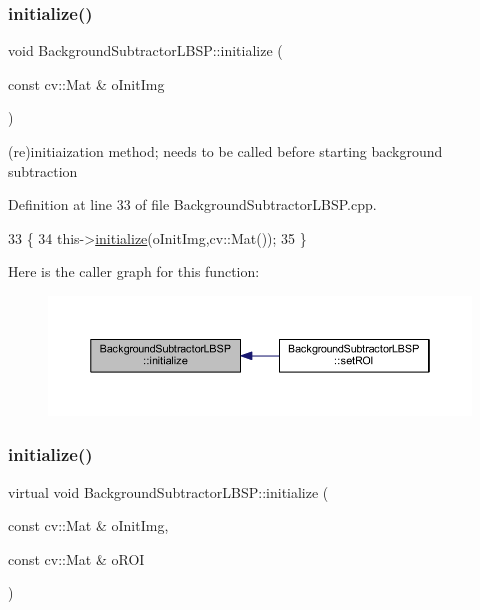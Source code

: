 \subsubsection{\texorpdfstring{initialize()}{initialize()}\hspace{0.1cm}{\footnotesize\ttfamily [1/2]}}
{\footnotesize\ttfamily void Background\+Subtractor\+L\+B\+S\+P\+::initialize (\begin{DoxyParamCaption}\item[{const cv\+::\+Mat \&}]{o\+Init\+Img }\end{DoxyParamCaption})\hspace{0.3cm}{\ttfamily [virtual]}}



(re)initiaization method; needs to be called before starting background subtraction 



Definition at line 33 of file Background\+Subtractor\+L\+B\+S\+P.\+cpp.


\begin{DoxyCode}
33                                                                \{
34     this->\mbox{\hyperlink{class_background_subtractor_l_b_s_p_ac6b854f94414497b143375d4a0ae8b6f}{initialize}}(oInitImg,cv::Mat());
35 \}
\end{DoxyCode}
Here is the caller graph for this function\+:
\nopagebreak
\begin{figure}[H]
\begin{center}
\leavevmode
\includegraphics[width=350pt]{class_background_subtractor_l_b_s_p_ac6b854f94414497b143375d4a0ae8b6f_icgraph}
\end{center}
\end{figure}
\mbox{\label{class_background_subtractor_l_b_s_p_a3644bc10ec3beda6fad22c633fe0f8fb}} 
\subsubsection{\texorpdfstring{initialize()}{initialize()}\hspace{0.1cm}{\footnotesize\ttfamily [2/2]}}
{\footnotesize\ttfamily virtual void Background\+Subtractor\+L\+B\+S\+P\+::initialize (\begin{DoxyParamCaption}\item[{const cv\+::\+Mat \&}]{o\+Init\+Img,  }\item[{const cv\+::\+Mat \&}]{o\+R\+OI }\end{DoxyParamCaption})\hspace{0.3cm}{\ttfamily [pure virtual]}}



